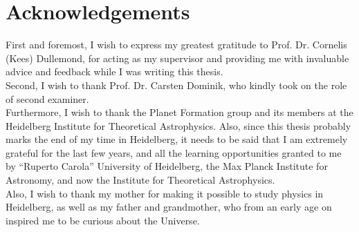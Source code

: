 \cleardoublepage
\chapter*{Acknowledgements}

\thispagestyle{NoHeader}

First and foremost, I wish to express my greatest gratitude to Prof. Dr. Cornelis (Kees) Dullemond,
for acting as my supervisor and providing me with invaluable advice and feedback while I was 
writing this thesis. \\

Second, I wish to thank Prof. Dr. Carsten Dominik, who kindly took on the role of second 
examiner. \\


Furthermore, I wish to thank the Planet Formation group and its members at the Heidelberg 
Institute for Theoretical Astrophysics. 
Also, since this thesis probably marks the end of my time in Heidelberg, it needs to be said that 
I am extremely grateful for the last few years, and all the learning opportunities granted to me by
``Ruperto Carola'' University of Heidelberg, the Max Planck Institute 
for Astronomy, and now the Institute for Theoretical Astrophysics. \\



Also, I wish to thank my mother for making it possible to study physics in Heidelberg,
as well as my father and grandmother, who from an early age on inspired me to be curious about 
the Universe. \\



